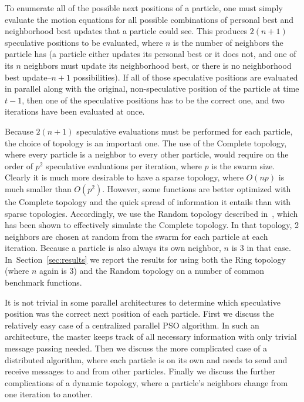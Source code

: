 \documentclass[conference,letterpaper]{IEEEtran}
\renewcommand{\sec}[1]{Section~\ref{sec:#1}}
\begin{document}
To enumerate all of the possible next positions of a particle, one must simply
evaluate the motion equations for all possible combinations of personal best
and neighborhood best updates that a particle could see.  This produces
$2(n+1)$ speculative positions to be evaluated, where $n$ is the number of
neighbors the particle has (a particle either updates its personal best or it
does not, and one of its $n$ neighbors must update its neighborhood best, or
there is no neighborhood best update--$n+1$ possibilities).  If all of those
speculative positions are evaluated in parallel along with the original,
non-speculative position of the particle at time $t-1$, then one of the
speculative positions has to be the correct one, and two iterations have been
evaluated at once.

Because $2(n+1)$ speculative evaluations must be performed for each particle,
the choice of topology is an important one.  The use of the Complete topology,
where every particle is a neighbor to every other particle, would require on
the order of $p^2$ speculative evaluations per iteration, where $p$ is the
swarm size.  Clearly it is much more desirable to have a sparse topology, where
$O(np)$ is much smaller than $O(p^2)$.  However, some functions are better
optimized with the Complete topology and the quick spread of information it
entails than with sparse topologies.  Accordingly, we use the Random topology
described in~\cite{mcnabb-cec09}, which has been shown to effectively simulate
the Complete topology.  In that topology, 2 neighbors are chosen at random from
the swarm for each particle at each iteration.  Because a particle is also
always its own neighbor, $n$ is $3$ in that case.  In~\sec{results} we report
the results for using both the Ring topology (where $n$ again is $3$) and the
Random topology on a number of common benchmark functions.

It is not trivial in some parallel architectures to determine which speculative
position was the correct next position of each particle.  First we discuss the
relatively easy case of a centralized parallel PSO algorithm.  In such an
architecture, the master keeps track of all necessary information with only
trivial message passing needed.  Then we discuss the more complicated case of a
distributed algorithm, where each particle is on its own and needs to send and
receive messages to and from other particles.  Finally we discuss the further
complications of a dynamic topology, where a particle's neighbors change from
one iteration to another.
\end{document}
